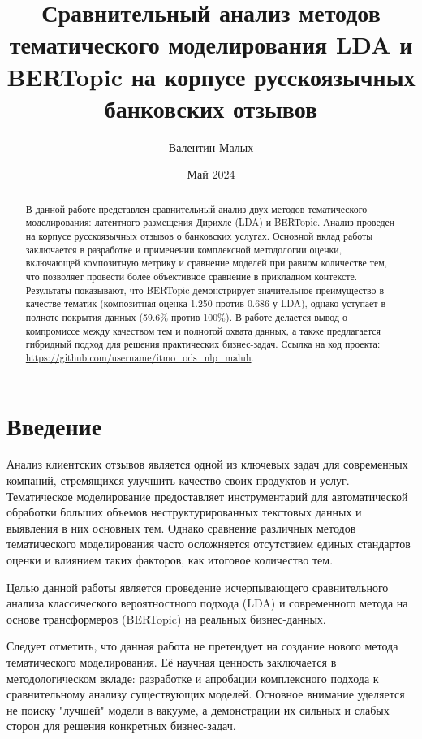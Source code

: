 \documentclass{article}
\title{Сравнительный анализ методов тематического моделирования LDA и BERTopic на корпусе русскоязычных банковских отзывов}
\author{Валентин Малых}
\date{Май 2024}
\begin{document}
\maketitle
\begin{abstract}
    В данной работе представлен сравнительный анализ двух методов тематического моделирования: латентного размещения Дирихле (LDA) и BERTopic. Анализ проведен на корпусе русскоязычных отзывов о банковских услугах. Основной вклад работы заключается в разработке и применении комплексной методологии оценки, включающей композитную метрику и сравнение моделей при равном количестве тем, что позволяет провести более объективное сравнение в прикладном контексте. Результаты показывают, что BERTopic демонстрирует значительное преимущество в качестве тематик (композитная оценка 1.250 против 0.686 у LDA), однако уступает в полноте покрытия данных (59.6\% против 100\%). В работе делается вывод о компромиссе между качеством тем и полнотой охвата данных, а также предлагается гибридный подход для решения практических бизнес-задач. Ссылка на код проекта: \url{https://github.com/username/itmo_ods_nlp_maluh}.
\end{abstract}



\section{Введение}
Анализ клиентских отзывов является одной из ключевых задач для современных компаний, стремящихся улучшить качество своих продуктов и услуг. Тематическое моделирование предоставляет инструментарий для автоматической обработки больших объемов неструктурированных текстовых данных и выявления в них основных тем. Однако сравнение различных методов тематического моделирования часто осложняется отсутствием единых стандартов оценки и влиянием таких факторов, как итоговое количество тем.

Целью данной работы является проведение исчерпывающего сравнительного анализа классического вероятностного подхода (LDA) и современного метода на основе трансформеров (BERTopic) на реальных бизнес-данных.

Следует отметить, что данная работа не претендует на создание нового метода тематического моделирования. Её научная ценность заключается в методологическом вкладе: разработке и апробации комплексного подхода к сравнительному анализу существующих моделей. Основное внимание уделяется не поиску "лучшей" модели в вакууме, а демонстрации их сильных и слабых сторон для решения конкретных бизнес-задач.
\end{document}
